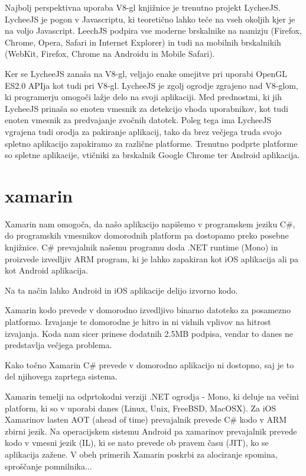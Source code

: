 Najbolj perspektivna uporaba V8-gl knjižnice je trenutno projekt LycheeJS. LycheeJS je pogon v Javascriptu, ki teoretično lahko teče na vseh okoljih kjer je na voljo Javascript. LeechJS podpira vse moderne brskalnike na namizju (Firefox, Chrome, Opera, Safari in Internet Explorer) in tudi na mobilnih brskalnikih (WebKit, Firefox, Chrome na Androidu in Mobile Safari). 

Ker se LycheeJS zanaša na V8-gl, veljajo enake omejitve pri uporabi OpenGL ES2.0 APIja kot tudi pri V8-gl. LycheeJS je zgolj ogrodje zgrajeno nad V8-glom, ki programerju omogoči lažje delo na svoji aplikaciji. Med prednostmi, ki jih LycheeJS prinaša so enoten vmesnik za detekcijo vhoda uporabnikov, kot tudi enoten vmesnik za predvajanje zvočnih datotek. Poleg tega ima LycheeJS vgrajena tudi orodja za pakiranje aplikacij, tako da brez večjega truda svojo spletno aplikacijo zapakiramo za različne platforme. Trenutno podprte platforme so spletne aplikacije, vtičniki za brskalnik Google Chrome ter Android aplikacija.

\section{xamarin}
\label{sec:xamarin}

Xamarin nam omogoča, da našo aplikacijo napišemo v programskem jeziku C\#, do programskih vmesnikov domorodnih platform pa dostopamo preko posebne knjižnice. C\# prevajalnik našemu programu doda .NET runtime (Mono) in proizvede izvedljiv ARM program, ki je lahko zapakiran kot iOS aplikacija ali pa kot Android aplikacija.

Na ta način lahko Android in iOS aplikacije delijo izvorno kodo. 

Xamarin kodo prevede v domorodno izvedljivo binarno datoteko za posamezno platformo. Izvajanje te domorodne je hitro in ni vidnih vplivov na hitrost izvajanja. Koda nam sicer prinese dodatnih 2.5MB podpisa, vendar to danes ne predstavlja večjega problema.

Kako točno Xamarin C\# prevede v domorodno aplikacijo ni dostopno, saj je to del njihovega zaprtega sistema. 

Xamarin temelji na odprtokodni verziji .NET ogrodja - Mono, ki deluje na večini platform, ki so v uporabi danes (Linux, Unix, FreeBSD, MacOSX). Za iOS Xamarinov lasten AOT (ahead of time) prevajalnik prevede C\# kodo v ARM zbirni jezik. Na operacijskem sistemu Android pa xamarinov prevajalnik prevede kodo v vmesni jezik (IL), ki se nato prevede ob pravem času (JIT), ko se aplikacija zažene. V obeh primerih Xamarin poskrbi za alociranje spomina, sproščanje pomnilnika... %

